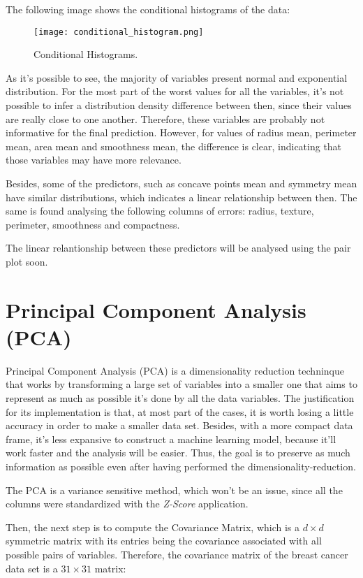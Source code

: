 \documentclass[conference]{IEEEtran}
\begin{document}
The following image shows the conditional histograms of the data:

\begin{figure}[h!]
\centerline{\texttt{[image: conditional\_histogram.png]}}
\caption{Conditional Histograms.}
\label{fig}
\end{figure}

As it's possible to see, the majority of variables present normal and exponential 
distribution. For the most part of the worst values for all the variables, it's not 
possible to infer a distribution density difference between then, since their values 
are really close to one another. Therefore, these variables are probably not 
informative for the final prediction. However, for values of radius mean, perimeter 
mean, area mean and smoothness mean, the difference is clear, indicating that 
those variables may have more relevance. 

Besides, some of the predictors, such as concave points mean and symmetry mean have 
similar distributions, which indicates a linear relationship between then. The same 
is found analysing the following columns of errors: radius, texture, perimeter, 
smoothness and compactness.

The linear relantionship between these predictors will be analysed using the pair 
plot soon.

\section{Principal Component Analysis (PCA)}

Principal Component Analysis (PCA) is a dimensionality reduction techninque that works by transforming a large set of variables into a smaller one that aims to represent as much as possible it's done by all the data variables. The justification for its implementation is that, at most part of the cases, it is worth losing a little accuracy in order to make a smaller data set. Besides, with a more compact data frame, it's less expansive to construct a machine learning model, because it'll work faster and the analysis will be easier. Thus, the goal is to preserve as much information as possible even after having performed the dimensionality-reduction.

The PCA is a variance sensitive method, which won't be an issue, since all the columns were standardized with the \textit{Z-Score} application. 

Then, the next step is to compute the Covariance Matrix, which is a $d \times d$ symmetric matrix with its entries being the covariance associated with all possible pairs of variables. Therefore, the covariance matrix of the breast cancer data set is a $31 \times 31$ matrix: 
\end{document}
